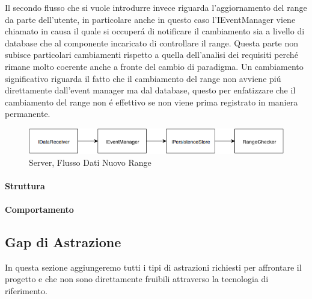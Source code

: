 Il secondo flusso che si vuole introdurre invece riguarda l'aggiornamento del range da parte dell'utente, in particolare anche in questo caso l'IEventManager viene chiamato in causa il quale si occuper\'a di notificare il cambiamento sia a livello di database che al componente incaricato di controllare il range. Questa parte non subisce particolari cambiamenti rispetto a quella dell'analisi dei requisiti perch\'e rimane molto coerente anche a fronte del cambio di paradigma. Un cambiamento significativo riguarda il fatto che il cambiamento del range non avviene pi\'u direttamente dall'event manager ma dal database, questo per enfatizzare che il cambiamento del range non \'e effettivo se non viene prima registrato in maniera permanente.

\begin{figure}[h]
\centering
\includegraphics[width=\textwidth]{Figures/LogicArchitecture/Server/FlowDiagramNewRange}
\caption{Server, Flusso Dati Nuovo Range}
\end{figure}



\paragraph{Struttura}

\paragraph{Comportamento}

\subsection{Gap di Astrazione}

In questa sezione aggiungeremo tutti i tipi di astrazioni richiesti per affrontare il progetto e che non sono direttamente fruibili attraverso la tecnologia di riferimento.

